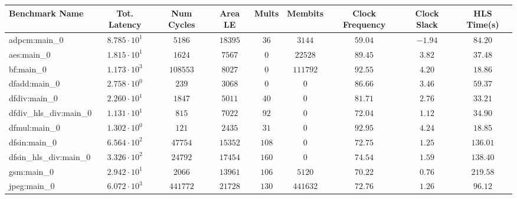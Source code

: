 \begin{tabular}{|l|c|c|c|c|c|c|c|c|}
\hline
Benchmark Name          & Tot. Latency           & Num Cycles & Area LE    & Mults   & Membits    & Clock Frequency & Clock Slack & HLS Time(s) \\
\hline
adpcm:main\_0           & $ 8.785 \cdot 10^{1} $ & $ 5186   $ & $ 18395  $ & $ 36  $ & $ 3144   $ & $ 59.04       $ & $ -1.94   $ & $ 84.20   $ \\
aes:main\_0             & $ 1.815 \cdot 10^{1} $ & $ 1624   $ & $ 7567   $ & $ 0   $ & $ 22528  $ & $ 89.45       $ & $ 3.82    $ & $ 37.48   $ \\
bf:main\_0              & $ 1.173 \cdot 10^{3} $ & $ 108553 $ & $ 8027   $ & $ 0   $ & $ 111792 $ & $ 92.55       $ & $ 4.20    $ & $ 18.86   $ \\
dfadd:main\_0           & $ 2.758 \cdot 10^{0} $ & $ 239    $ & $ 3068   $ & $ 0   $ & $ 0      $ & $ 86.66       $ & $ 3.46    $ & $ 59.37   $ \\
dfdiv:main\_0           & $ 2.260 \cdot 10^{1} $ & $ 1847   $ & $ 5011   $ & $ 40  $ & $ 0      $ & $ 81.71       $ & $ 2.76    $ & $ 33.21   $ \\
dfdiv\_hls\_div:main\_0 & $ 1.131 \cdot 10^{1} $ & $ 815    $ & $ 7022   $ & $ 92  $ & $ 0      $ & $ 72.04       $ & $ 1.12    $ & $ 34.90   $ \\
dfmul:main\_0           & $ 1.302 \cdot 10^{0} $ & $ 121    $ & $ 2435   $ & $ 31  $ & $ 0      $ & $ 92.95       $ & $ 4.24    $ & $ 18.85   $ \\
dfsin:main\_0           & $ 6.564 \cdot 10^{2} $ & $ 47754  $ & $ 15352  $ & $ 108 $ & $ 0      $ & $ 72.75       $ & $ 1.25    $ & $ 136.01  $ \\
dfsin\_hls\_div:main\_0 & $ 3.326 \cdot 10^{2} $ & $ 24792  $ & $ 17454  $ & $ 160 $ & $ 0      $ & $ 74.54       $ & $ 1.59    $ & $ 138.40  $ \\
gsm:main\_0             & $ 2.942 \cdot 10^{1} $ & $ 2066   $ & $ 13961  $ & $ 106 $ & $ 5120   $ & $ 70.22       $ & $ 0.76    $ & $ 219.58  $ \\
jpeg:main\_0            & $ 6.072 \cdot 10^{3} $ & $ 441772 $ & $ 21728  $ & $ 130 $ & $ 441632 $ & $ 72.76       $ & $ 1.26    $ & $ 96.12   $ \\

\end{tabular}
